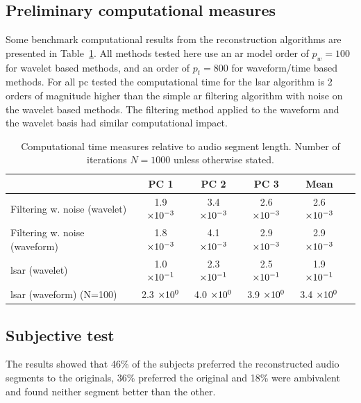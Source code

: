 \subsection{Preliminary computational measures}\label{sec:CompData}
Some benchmark computational results from the reconstruction algorithms are presented in Table~\ref{tab:CompData}. All methods tested here use an \gls{ar} model order of $p_w=100$ for wavelet based methods, and an order of $p_t=800$ for waveform/time based methods. For all \gls{pc} tested the computational time for the \gls{lsar} algorithm is 2 orders of magnitude higher than the simple \gls{ar} filtering algorithm with noise on the wavelet based methods. The filtering method applied to the waveform and the wavelet basis had similar computational impact.

\begin{table}\begin{center}
\caption{Computational time measures relative to audio segment length. Number of iterations $N=1000$ unless otherwise stated.}
\label{tab:CompData}
\begin{tabular}{|l|c|c|c|c|c|}\hline
                                & PC 1              & PC 2              & PC 3              &  Mean \\ \hline
  Filtering w. noise (wavelet)  & 1.9 $\times 10^{-3}$    & 3.4 $\times 10^{-3}$    & 2.6 $\times 10^{-3}$    &  2.6 $\times 10^{-3}$  \\
  Filtering w. noise (waveform) & 1.8 $\times 10^{-3}$    & 4.1 $\times 10^{-3}$    & 2.9 $\times 10^{-3}$    &  2.9 $\times 10^{-3}$  \\
  \gls{lsar} (wavelet)                & 1.0 $\times 10^{-1}$    & 2.3 $\times 10^{-1}$    & 2.5 $\times 10^{-1}$    &  1.9 $\times 10^{-1}$  \\
  \gls{lsar} (waveform) (N=100)       & 2.3 $\times 10^{0}$     & 4.0 $\times 10^{0}$     & 3.9 $\times 10^{0}$     &  3.4 $\times 10^{0}$  \\ \hline
\end{tabular}\end{center}\end{table}


\subsection{Subjective test}\label{sec:ResultsSubjectiveTest}


The results showed that 46\% of the subjects preferred the reconstructed audio segments to the originals, 36\% preferred the original and 18\% were ambivalent and found neither segment better than the other.

